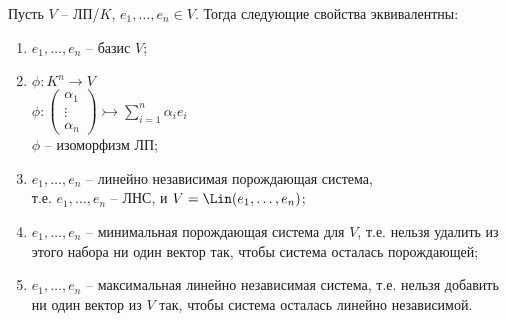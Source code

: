 \begin{theorem-non}
\end{theorem-non}
Пусть $V$ -- ЛП/$K$, $e_1, \dots, e_n \in V$.
Тогда следующие свойства эквивалентны:
\begin{enumerate}
    \item $e_1, \dots, e_n$ -- базис $V$;
    \item $\phi : K^n \rightarrow V$\\
    $\phi : \begin{pmatrix}
        \alpha_1 \\ \vdots \\ \alpha_n
    \end{pmatrix} \rightarrowtail
    \sum \limits_{i=1}^n \alpha_i e_i$\\
    $\phi$ -- изоморфизм ЛП;
    \item $e_1, \dots, e_n$ -- линейно независимая порождающая система,\\
    т.е. $e_1, \dots, e_n$ -- ЛНС, и $V = \Lin(e_1, \dots, e_n)$;
    \item $e_1, \dots, e_n$ -- минимальная порождающая система для $V$,
    т.е. нельзя удалить из этого набора ни один вектор так, чтобы
    система осталась порождающей;
    \item $e_1, \dots, e_n$ -- максимальная линейно независимая система,
    т.е. нельзя добавить ни один вектор из $V$ так, чтобы система
    осталась линейно независимой.
\end{enumerate}
